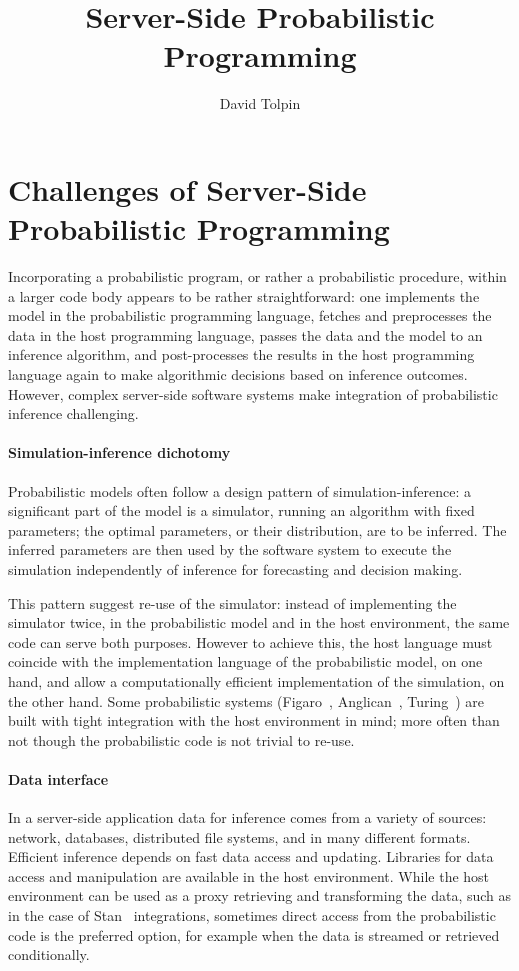 \documentclass[sigplan,review]{acmart}\settopmatter{printfolios=true,printccs=false,printacmref=false}
\title{Server-Side Probabilistic Programming}
\author{David Tolpin}
\affiliation{
    \institution{PUB+}
    \country{Israel}
}
\begin{document}
\maketitle

\section{Challenges of Server-Side Probabilistic Programming}

Incorporating a probabilistic program, or rather a probabilistic
procedure, within a larger code body appears to be rather
straightforward: one implements the model in the probabilistic
programming language, fetches and preprocesses the data in the
host programming language, passes the data and the model to an
inference algorithm, and post-processes the results in the
host programming language again to make algorithmic
decisions based on inference outcomes. However, complex
server-side software systems make integration of probabilistic
inference challenging. 

\paragraph{Simulation-inference dichotomy} Probabilistic models
often follow a design pattern of simulation-inference: a
significant part of the model is a simulator, running an
algorithm with fixed parameters; the optimal parameters, or
their distribution, are to be inferred. The inferred parameters
are then used by the software system to execute the simulation
independently of inference for forecasting and decision making.

This pattern suggest re-use of the simulator: instead of
implementing the simulator twice, in the probabilistic model and
in the host environment, the same code can serve both purposes.
However to achieve this, the host language must coincide with
the implementation language of the probabilistic model, on one
hand, and allow a computationally efficient implementation of
the simulation, on the other hand. Some probabilistic systems
(Figaro~\cite{P09}, Anglican~\cite{TMY+16}, Turing~\cite{GXG18})
are built with tight integration with the host environment in
mind; more often than not though the probabilistic code is
not trivial to re-use.

\paragraph{Data interface} In a server-side application data
for inference comes from a variety of sources: network,
databases, distributed file systems, and in many different
formats. Efficient inference depends on fast data access and
updating. Libraries for data access and manipulation are
available in the host environment. While the host environment
can be used as a proxy retrieving and transforming the data,
such as in the case of Stan~\cite{Stan17} integrations,
sometimes direct access from the probabilistic code is the
preferred option, for example when the data is streamed or
retrieved conditionally. 
\end{document}
